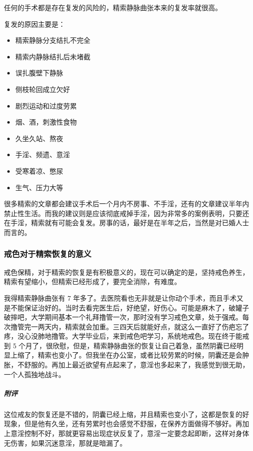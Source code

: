 任何的手术都是存在复发的风险的，精索静脉曲张本来的复发率就很高。

复发的原因主要是：

\begin{multicols}{2}
    \begin{itemize}
        \item 精索静脉分支结扎不完全
        \item 精索内静脉结扎后未堵截
        \item 误扎腹壁下静脉
        \item 侧枝轮回成立欠好
        \item 剧烈运动和过度劳累
        \item 烟、酒，刺激性食物
        \item 久坐久站、熬夜
        \item 手淫、频遗、意淫
        \item 受寒着凉、憋尿
        \item 生气、压力大等
    \end{itemize}
\end{multicols}

很多精索的文章都会建议手术后一个月内不房事、不手淫，还有的文章建议半年内禁止性生活。而我的建议则是应该彻底戒掉手淫，因为非常多的案例表明，只要还在手淫，精索就有可能会复发。房事的话，最好是在半年之后，当然是对已婚人士而言的。

\subsubsection{戒色对于精索恢复的意义}

戒色保精，对于精索的恢复是有积极意义的，现在可以确定的是，坚持戒色养生，精索有望缩小，但精索已经形成了，要完全消除，有难度。

\begin{case}[精索静脉曲张]
    我得精索静脉曲张有 7 年多了。去医院看也无非就是让你动个手术，而且手术又是不能保证治好的。当时去看完医生后，好绝望，好伤心。可能是麻木了，破罐子破摔吧，大学期间基本一个礼拜撸管一次，那时没有学习戒色文章，处于强戒。每次撸管完一两天内，精索就会加重。三四天后就能好点，就这么一直好了伤疤忘了疼，没心没肺地撸管。大学毕业后，来到戒色吧学习，系统地戒色。现在终于能戒到 5 个月了，很欣慰，但是，精索静脉曲张的恢复让自己着急，虽然阴囊已经明显上缩了，精索也变小了。但我坐在办公室，或者比较劳累的时候，阴囊还是会肿胀，不舒服的。再加上最近欲望有点起来了，意淫也多起来了，我感觉到很无助，一个人孤独地战斗。
    \subparagraph{附评} 这位戒友的恢复还是不错的，阴囊已经上缩，并且精索也变小了，这都是恢复的好现象，但是他有久坐，还有劳累时也会感觉不舒服，在保养方面做得不够好。再加上意淫控制不好，那就更容易出现症状反复了，意淫一定要念起即断，这样对身体无伤害，如果沉迷意淫，那就是暗漏了。
\end{case}

